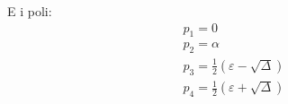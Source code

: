 E i poli:
\begin{displaymath}
\begin{array}{cc}
p_{1}=0 \\
p_{2}=\alpha \\
p_{3}=\frac{1}{2}(\varepsilon-\sqrt{\Delta}) \\
p_{4}=\frac{1}{2}(\varepsilon+\sqrt{\Delta})
\end{array}
\end{displaymath}
